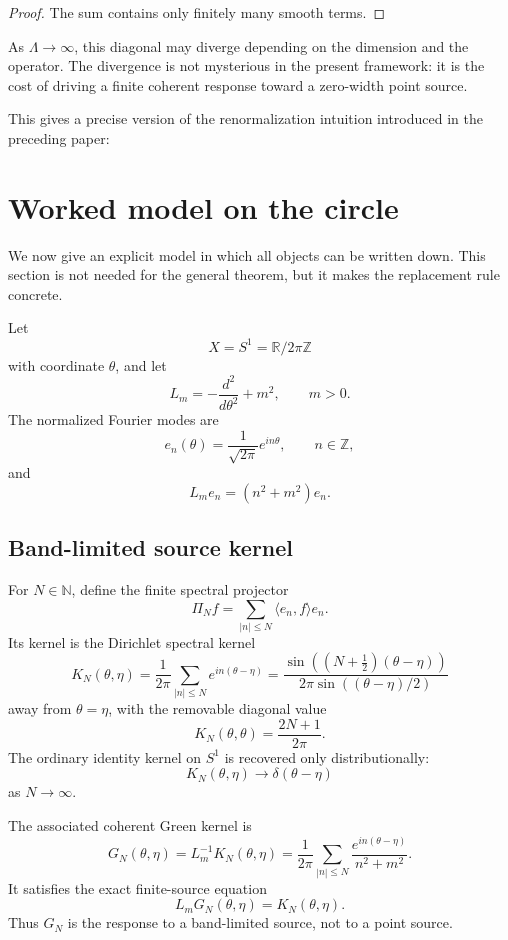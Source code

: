 \documentclass[11pt]{article}
\begin{document}
\begin{proof}
The sum contains only finitely many smooth terms.
\end{proof}

\begin{remark}
As \(\Lambda\to\infty\), this diagonal may diverge depending on the dimension and the operator. The divergence is not mysterious in the present framework: it is the cost of driving a finite coherent response toward a zero-width point source.
\end{remark}

This gives a precise version of the renormalization intuition introduced in the preceding paper:
\begin{center}
\end{center}


\section{Worked model on the circle}

We now give an explicit model in which all objects can be written down. This section is not needed for the general theorem, but it makes the replacement rule concrete.

Let
\[
X=S^1=\mathbb R/2\pi\mathbb Z
\]
with coordinate \(\theta\), and let
\[
L_m=-\frac{d^2}{d\theta^2}+m^2,
\qquad m>0.
\]
The normalized Fourier modes are
\[
e_n(\theta)=\frac{1}{\sqrt{2\pi}}e^{in\theta},
\qquad n\in\mathbb Z,
\]
and
\[
L_m e_n=(n^2+m^2)e_n.
\]

\subsection{Band-limited source kernel}

For \(N\in\mathbb N\), define the finite spectral projector
\[
\Pi_N f=\sum_{|n|\le N}\langle e_n,f\rangle e_n.
\]
Its kernel is the Dirichlet spectral kernel
\[
K_N(\theta,\eta)
=
\frac{1}{2\pi}\sum_{|n|\le N}e^{in(\theta-\eta)}
=
\frac{\sin((N+\frac12)(\theta-\eta))}{2\pi\sin((\theta-\eta)/2)}
\]
away from \(\theta=\eta\), with the removable diagonal value
\[
K_N(\theta,\theta)=\frac{2N+1}{2\pi}.
\]
The ordinary identity kernel on \(S^1\) is recovered only distributionally:
\[
K_N(\theta,\eta)\to \delta(\theta-\eta)
\]
as \(N\to\infty\).

The associated coherent Green kernel is
\[
G_N(\theta,\eta)
=
L_m^{-1}K_N(\theta,\eta)
=
\frac{1}{2\pi}\sum_{|n|\le N}
\frac{e^{in(\theta-\eta)}}{n^2+m^2}.
\]
It satisfies the exact finite-source equation
\[
L_mG_N(\theta,\eta)=K_N(\theta,\eta).
\]
Thus \(G_N\) is the response to a band-limited source, not to a point source.
\end{document}
